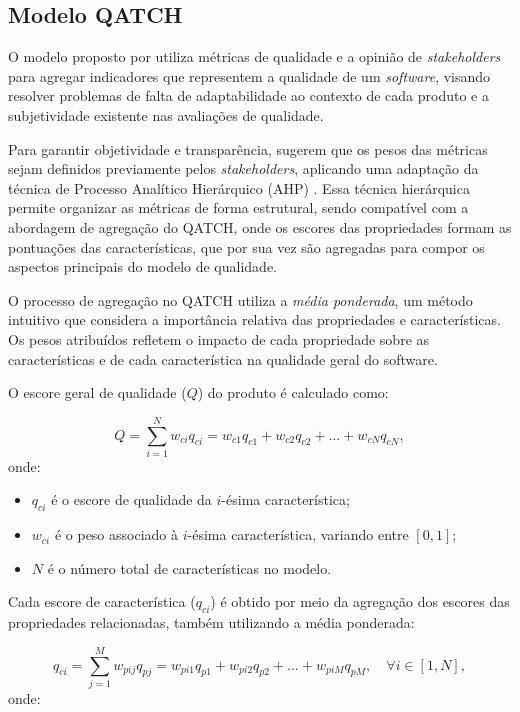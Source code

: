 \subsection{Modelo QATCH}
\label{subsec:qatch}

O modelo proposto por  utiliza métricas de qualidade e a opinião de \textit{stakeholders} para agregar indicadores que representem a qualidade de um \textit{software}, visando resolver problemas de falta de adaptabilidade ao contexto de cada produto e a subjetividade existente nas avaliações de qualidade.

Para garantir objetividade e transparência,  sugerem que os pesos das métricas sejam definidos previamente pelos \textit{stakeholders}, aplicando uma adaptação da técnica de Processo Analítico Hierárquico (AHP) \cite{ahp}. Essa técnica hierárquica permite organizar as métricas de forma estrutural, sendo compatível com a abordagem de agregação do QATCH, onde os escores das propriedades formam as pontuações das características, que por sua vez são agregadas para compor os aspectos principais do modelo de qualidade.

O processo de agregação no QATCH utiliza a \textit{média ponderada}, um método intuitivo que considera a importância relativa das propriedades e características. Os pesos atribuídos refletem o impacto de cada propriedade sobre as características e de cada característica na qualidade geral do software.

O escore geral de qualidade (\( Q \)) do produto é calculado como:

\[
Q = \sum_{i=1}^N w_{ci}q_{ci} = w_{c1}q_{c1} + w_{c2}q_{c2} + \dots + w_{cN}q_{cN},
\]
\noindent
onde:

\begin{itemize}
    \item \( q_{ci} \) é o escore de qualidade da \( i \)-ésima característica;
    \item \( w_{ci} \) é o peso associado à \( i \)-ésima característica, variando entre \([0,1]\);
    \item \( N \) é o número total de características no modelo.
\end{itemize}

Cada escore de característica (\( q_{ci} \)) é obtido por meio da agregação dos escores das propriedades relacionadas, também utilizando a média ponderada:

\[
q_{ci} = \sum_{j=1}^M w_{pij}q_{pj} = w_{pi1}q_{p1} + w_{pi2}q_{p2} + \dots + w_{piM}q_{pM}, \quad \forall i \in [1, N],
\]
\noindent
onde:

